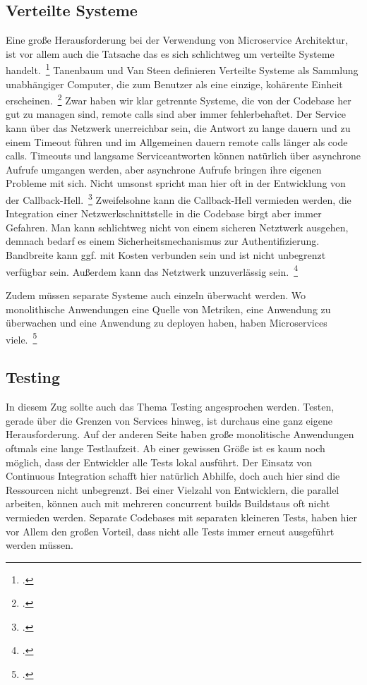 \subsection{Verteilte Systeme}
Eine große Herausforderung bei der Verwendung von Microservice Architektur, ist vor allem auch die Tatsache das es sich schlichtweg um verteilte Systeme handelt.~\footcite[][]{microtradeoffs}
Tanenbaum und Van Steen definieren Verteilte Systeme als Sammlung unabhängiger Computer, die zum Benutzer als eine einzige, kohärente Einheit erscheinen.~\footcite[][Seite 2]{tanenbaum2002distributed}
Zwar haben wir klar getrennte Systeme, die von der Codebase her gut zu managen sind, remote calls sind aber immer fehlerbehaftet. Der Service kann über das Netzwerk unerreichbar sein, die Antwort zu lange dauern und zu einem Timeout führen und im Allgemeinen dauern remote calls länger als code calls. Timeouts und langsame Serviceantworten können natürlich über asynchrone Aufrufe umgangen werden, aber asynchrone Aufrufe bringen ihre eigenen Probleme mit sich. Nicht umsonst spricht man hier oft in der Entwicklung von der Callback-Hell.~\footcite[vgl.][]{callbackhell} Zweifelsohne kann die Callback-Hell vermieden werden, die Integration einer Netzwerkschnittstelle in die Codebase birgt aber immer Gefahren. Man kann schlichtweg nicht von einem sicheren Netztwerk ausgehen, demnach bedarf es einem Sicherheitsmechanismus zur Authentifizierung. Bandbreite kann ggf. mit Kosten verbunden sein und ist nicht unbegrenzt verfügbar sein. Außerdem kann das Netztwerk unzuverlässig sein.~\footcite[vgl.][]{distributedfallacies}

Zudem müssen separate Systeme auch einzeln überwacht werden. Wo monolithische Anwendungen eine Quelle von Metriken, eine Anwendung zu überwachen und eine Anwendung zu deployen haben, haben Microservices viele.~\footcite[vgl.][]{Heroku:GoMicro}

\subsection{Testing}
\label{section:testing}
In diesem Zug sollte auch das Thema Testing angesprochen werden. Testen, gerade über die Grenzen von Services hinweg, ist durchaus eine ganz eigene Herausforderung. Auf der anderen Seite haben große monolitische Anwendungen oftmals eine lange Testlaufzeit. Ab einer gewissen Größe ist es kaum noch möglich, dass der Entwickler alle Tests lokal ausführt. Der Einsatz von Continuous Integration schafft hier natürlich Abhilfe, doch auch hier sind die Ressourcen nicht unbegrenzt. Bei einer Vielzahl von Entwicklern, die parallel arbeiten, können auch mit mehreren concurrent builds Buildstaus oft nicht vermieden werden. Separate Codebases mit separaten kleineren Tests, haben hier vor Allem den großen Vorteil, dass nicht alle Tests immer erneut ausgeführt werden müssen.

